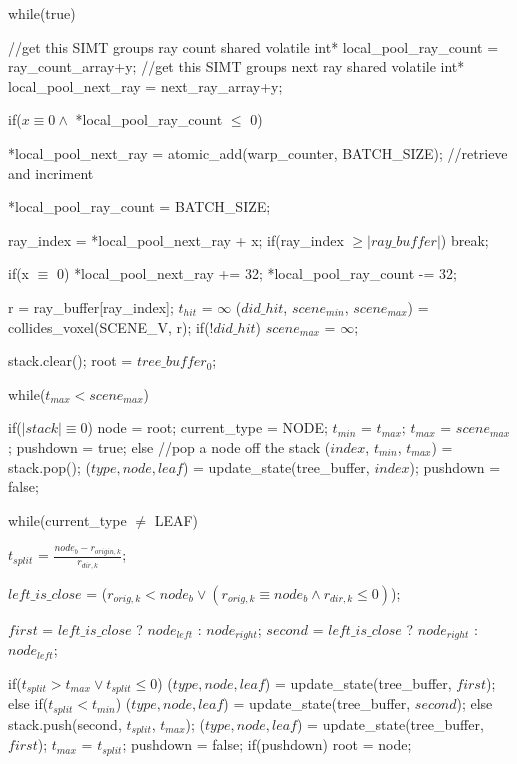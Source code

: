 \documentclass[12pt,letterpaper]{article}
\begin{document}
\begin{algorithm}[caption={Persistent Short Stack K-D Tree Traversal.}, label={alg1}]
{    while(true)
    {
      //get this SIMT groups ray count
      shared volatile int* local_pool_ray_count = ray_count_array+y;
      //get this SIMT groups next ray
      shared volatile int* local_pool_next_ray  = next_ray_array+y; 

      if($x \equiv 0 \land$ *local_pool_ray_count $\leq$ 0)
      {
        *local_pool_next_ray = atomic_add(warp_counter, BATCH_SIZE); //retrieve and incriment

        *local_pool_ray_count = BATCH_SIZE;
      }

      ray_index = *local_pool_next_ray + x;
      if(ray_index $\geq |ray\_buffer|$)
        break;

      if(x $\equiv$ 0)
      {
        *local_pool_next_ray += 32;
        *local_pool_ray_count -= 32;
      }

      r = ray_buffer[ray_index];
      $t_{hit}$ = $\infty$
      ($did\_hit$, $scene_{min}$, $scene_{max}$) = collides_voxel(SCENE_V, r);
      if(!$did\_hit$)
        $scene_{max}$ = $\infty$;

      stack.clear();
      root = $tree\_buffer_0$;

      while($t_{max} < scene_{max}$)
      {
        if($|stack|\equiv 0$)
        {
          node = root;
          current_type = NODE;
          $t_{min}$ = $t_{max}$;
          $t_{max}$ = $scene_{max}$;
          pushdown = true;
        }
        else //pop a node off the stack
        {
          ($index$, $t_{min}$, $t_{max}$) = stack.pop();
          ($type, node, leaf$) = update_state(tree_buffer, $index$);
          pushdown = false;
        }

        while(current_type $\neq$ LEAF)
        {
          $t_{split}$ = $\frac{node_b - r_{origin,k}}{r_{dir,k}}$;

          $left\_is\_close$ = ($r_{orig,k} < node_b \lor (r_{orig,k} \equiv node_b \land r_{dir,k} \leq 0)$);

          $first$  = $left\_is\_close$ ? $node_{left}$ : $node_{right}$;
          $second$ = $left\_is\_close$ ? $node_{right}$ : $node_{left}$;

          if($t_{split} > t_{max} \lor t_{split} \leq 0$)
            ($type, node, leaf$) = update_state(tree_buffer, $first$);
          else if($t_{split} < t_{min}$)
            ($type, node, leaf$) = update_state(tree_buffer, $second$);
          else
          {
            stack.push({second, $t_{split}$, $t_{max}$});
            ($type, node, leaf$) = update_state(tree_buffer, $first$);
            $t_{max}$ = $t_{split}$;
            pushdown = false;
          }
          if(pushdown)
            root = node;
        }

}}}
\end{algorithm}
\end{document}
